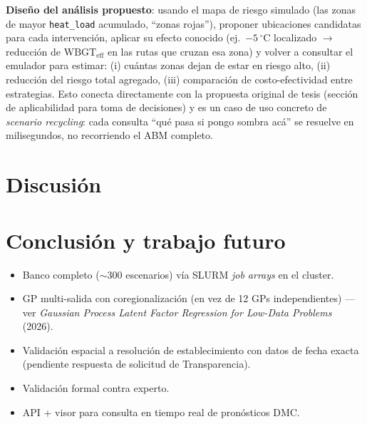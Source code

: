 \documentclass[11pt,a4paper]{article}
\begin{document}
\textbf{Diseño del análisis propuesto}: usando el mapa de riesgo simulado
(las zonas de mayor \texttt{heat\_load} acumulado, ``zonas rojas''),
proponer ubicaciones candidatas para cada intervención, aplicar su efecto
conocido (ej.\ $-5\,^\circ$C localizado $\to$ reducción de
$\mathrm{WBGT}_{\mathrm{eff}}$ en las rutas que cruzan esa zona) y volver a
consultar el emulador para estimar: (i) cuántas zonas dejan de estar en
riesgo alto, (ii) reducción del riesgo total agregado, (iii) comparación de
costo-efectividad entre estrategias. Esto conecta directamente con la
propuesta original de tesis (sección de aplicabilidad para toma de
decisiones) y es un caso de uso concreto de \emph{scenario recycling}: cada
consulta ``qué pasa si pongo sombra acá'' se resuelve en milisegundos, no
recorriendo el ABM completo.

\section{Discusión}

\section{Conclusión y trabajo futuro}

\begin{itemize}[leftmargin=*]
    \item Banco completo ($\sim$300 escenarios) vía SLURM \emph{job arrays}
        en el cluster.
    \item GP multi-salida con coregionalización (en vez de 12 GPs
        independientes) --- ver \emph{Gaussian Process Latent Factor
        Regression for Low-Data Problems} (2026).
    \item Validación espacial a resolución de establecimiento con datos de
        fecha exacta (pendiente respuesta de solicitud de Transparencia).
    \item Validación formal contra experto.
    \item API + visor para consulta en tiempo real de pronósticos DMC.
\end{itemize}

\end{document}
